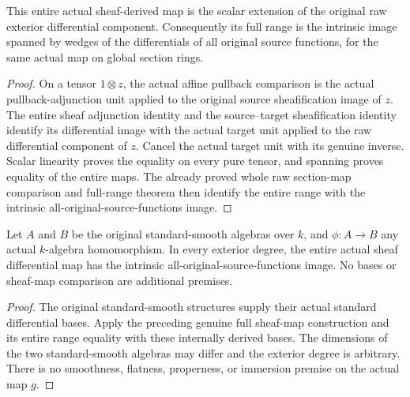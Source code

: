 \begin{theorem}\label{sc0-affine-canonical-sheaf-image:whole}
\leanok
{}
This entire actual sheaf-derived map is the scalar extension of the original raw exterior differential component. Consequently its full range is the intrinsic image spanned by wedges of the differentials of all original source functions, for the same actual map on global section rings.
\end{theorem}
\begin{proof}
On a tensor $1\otimes z$, the actual affine pullback comparison is the actual pullback-adjunction unit applied to the original source sheafification image of $z$. The entire sheaf adjunction identity and the source--target sheafification identity identify its differential image with the actual target unit applied to the raw differential component of $z$. Cancel the actual target unit with its genuine inverse. Scalar linearity proves the equality on every pure tensor, and spanning proves equality of the entire maps. The already proved whole raw section-map comparison and full-range theorem then identify the entire range with the intrinsic all-original-source-functions image.
\end{proof}

\begin{theorem}\label{sc0-affine-canonical-sheaf-image:standard-smooth}
\leanok
{}
Let $A$ and $B$ be the original standard-smooth algebras over $k$, and $\phi:A\to B$ any actual $k$-algebra homomorphism. In every exterior degree, the entire actual sheaf differential map has the intrinsic all-original-source-functions image. No bases or sheaf-map comparison are additional premises.
\end{theorem}
\begin{proof}
The original standard-smooth structures supply their actual standard differential bases. Apply the preceding genuine full sheaf-map construction and its entire range equality with these internally derived bases. The dimensions of the two standard-smooth algebras may differ and the exterior degree is arbitrary. There is no smoothness, flatness, properness, or immersion premise on the actual map $g$.
\end{proof}
